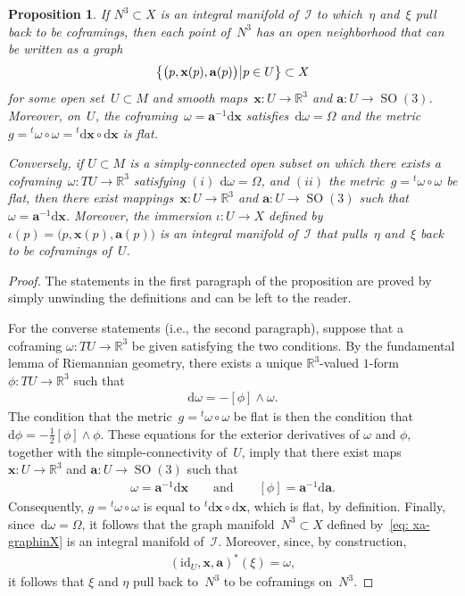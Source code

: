 \documentclass[11pt]{article}
\numberwithin{equation}{section}
\newtheorem{Proposition}[Theorem]{Proposition}
 { \theoremstyle{definition}
\newtheorem{Example}[Theorem]{Example}
\newtheorem{Remark}[Theorem]{Remark} }
\renewcommand{\d}{\mathrm{d}}%
\newcommand{\cI}{{\mathcal I}}
\newcommand{\bbR}{{\mathbb R}}
\newcommand{\SO}{\operatorname{SO}}
\newcommand{\mba}{\mathbf{a}}
\newcommand{\mbx}{\mathbf{x}}
\begin{document}
\begin{Proposition}\label{prop: formulation_as_EDS} If $N^3\subset X$ is an integral manifold of~$\cI$ to which~$\eta$ and~$\xi$ pull back to be coframings, then each point of~$N^3$ has an open neighborhood that can be written as a graph
\begin{gather}\label{eq: xa-graphinX}
\bigl\{\bigl(p,\mbx(p),\mba(p)\bigr)\, \vrule \, p\in U \bigr\}\subset X
\end{gather}
for some open set~$U\subset M$ and smooth maps~$\mbx\colon U\to\mathbb{R}^3$
and $\mba\colon U\to\SO(3)$. Moreover, on~$U$,
the coframing~$\omega = \mba^{-1} \d \mbx$ satisfies~$\d\omega=\Omega$
and the metric~$g = {}^t\omega\circ \omega = {}^t\d \mbx\circ \d \mbx$ is flat.

Conversely, if $U\subset M$ is a simply-connected open subset on which there exists a coframing~$\omega\colon TU\to\bbR^3$ satisfying $(i)$ $\d\omega=\Omega$, and $(ii)$ the metric~$g={}^t\omega\circ \omega$ be flat, then there exist mappings~$\mbx\colon U\to\bbR^3$ and $\mba\colon U\to\SO(3)$ such that $\omega = \mba^{-1} \d \mbx$. Moreover, the immersion $\iota\colon U\to X$ defined by $\iota(p) = \bigl(p,\mbx(p),\mba(p)\bigr)$ is an integral manifold of~$\cI$ that pulls~$\eta$ and~$\xi$ back to be coframings of~$U$.
\end{Proposition}

\begin{proof} The statements in the first paragraph of the proposition are proved by simply unwinding the definitions and can be left to the reader.

For the converse statements (i.e., the second paragraph), suppose that a coframing $\omega\colon TU\to\bbR^3$ be given satisfying the two conditions. By the fundamental lemma of Riemannian geometry, there exists a unique $\bbR^3$-valued $1$-form~$\phi\colon TU\to\bbR^3$ such that
\begin{gather*}
\d\omega = -[\phi]\wedge\omega.
\end{gather*}
The condition that the metric~$g = {}^t\omega\circ \omega$ be flat is then the condition that~$\d\phi = -\tfrac12 [\phi]\wedge\phi$. These equations for the exterior derivatives of $\omega$ and $\phi$, together with the simple-connectivity of~$U$, imply that there exist maps~$\mbx\colon U\to\bbR^3$ and $\mba\colon U\to\SO(3)$ such that
\begin{gather}\label{flat-omega-and-phi}
\omega = \mba^{-1} \d \mbx
\qquad\text{and}\qquad
[\phi] = \mba^{-1} \d \mba.
\end{gather}
Consequently, $g = {}^t\omega\circ \omega$ is equal to ${}^t\d \mbx\circ \d \mbx$, which is flat, by definition. Finally, since~$\d\omega = \Omega$, it follows that the graph manifold~$N^3\subset X$ defined by~\eqref{eq: xa-graphinX} is an integral manifold of~$\cI$. Moreover, since, by construction,
\begin{gather*}
(\mathrm{id}_U, \mbx ,\mba)^*(\xi) = \omega,
\end{gather*}
it follows that $\xi$ and $\eta$ pull back to~$N^3$ to be coframings on~$N^3$.
\end{proof}
\end{document}
